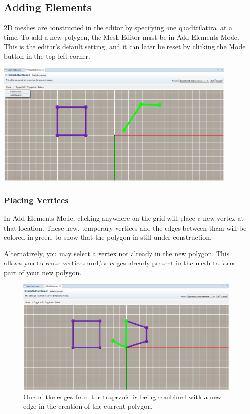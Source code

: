\documentclass{article}
\begin{document}
\subsection{Adding Elements}

2D meshes are constructed in the editor by specifying one quadtrilatiral at a
time. To add a new polygon, the Mesh Editor must be in Add Elements Mode. This
is the editor's default setting, and it can later be reset by clicking the Mode
button in the top left corner. 

\begin{center}
\includegraphics[width=12cm]{images/MeshEditorAddMode}
\end{center}

\subsubsection{Placing Vertices}

In Add Elements Mode, clicking anywhere on the grid will place a new vertex at
that location. These new, temporary vertices and the edges between them will be
colored in green, to show that the polygon in still under construction.

Alternatively, you may select a vertex not already in the new polygon. This
allows you to reuse vertices and/or edges already present in the mesh to form
part of your new polygon.

\begin{figure}
\begin{center}
\includegraphics[width=12cm]{images/MeshEditorReuseEdge}
\caption{One of the edges from the trapezoid is being combined with a new edge
in the creation of the current polygon.}
\end{center}
\end{figure}
\end{document}
